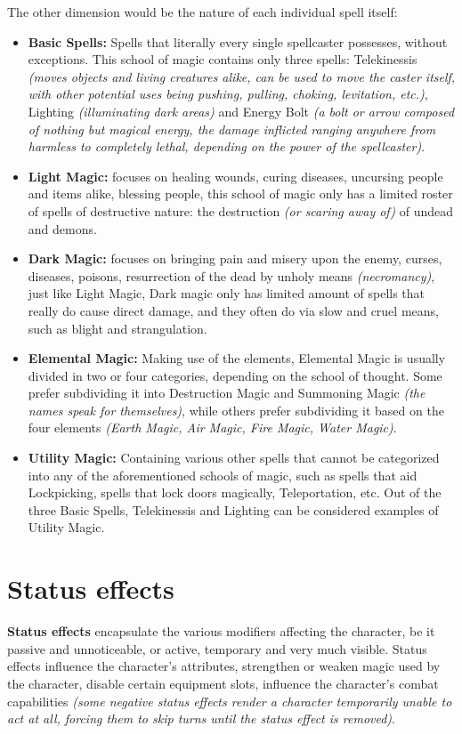 \documentclass[openany,11pt,a4paper]{book}
\begin{document}
The other dimension would be the nature of each individual spell itself:
\begin{itemize}
\item \textbf{Basic Spells:} Spells that literally every single spellcaster possesses, without exceptions. This school of magic contains only three spells: Telekinessis \textit{(moves objects and living creatures alike, can be used to move the caster itself, with other potential uses being pushing, pulling, choking, levitation, etc.)}, Lighting \textit{(illuminating dark areas)} and Energy Bolt \textit{(a bolt or arrow composed of nothing but magical energy, the damage inflicted ranging anywhere from harmless to completely lethal, depending on the power of the spellcaster)}.
\item \textbf{Light Magic:} focuses on healing wounds, curing diseases, uncursing people and items alike, blessing people, this school of magic only has a limited roster of spells of destructive nature: the destruction \textit{(or scaring away of)} of undead and demons.
\item \textbf{Dark Magic:} focuses on bringing pain and misery upon the enemy, curses, diseases, poisons, resurrection of the dead by unholy means \textit{(necromancy)}, just like Light Magic, Dark magic only has limited amount of spells that really do cause direct damage, and they often do via slow and cruel means, such as blight and strangulation.
\item \textbf{Elemental Magic:} Making use of the elements, Elemental Magic is usually divided in two or four categories, depending on the school of thought. Some prefer subdividing it into Destruction Magic and Summoning Magic \textit{(the names speak for themselves)}, while others prefer subdividing it based on the four elements \textit{(Earth Magic, Air Magic, Fire Magic, Water Magic)}.
\item \textbf{Utility Magic:} Containing various other spells that cannot be categorized into any of the aforementioned schools of magic, such as spells that aid Lockpicking, spells that lock doors magically, Teleportation, etc. Out of the three Basic Spells, Telekinessis and Lighting can be considered examples of Utility Magic.
\end{itemize}
\section{Status effects}
\textbf{Status effects} encapsulate the various modifiers affecting the character, be it passive and unnoticeable, or active, temporary and very much visible. Status effects influence the character's attributes, strengthen or weaken magic used by the character, disable certain equipment slots, influence the character's combat capabilities \textit{(some negative status effects render a character temporarily unable to act at all, forcing them to skip turns until the status effect is removed)}.
\end{document}
